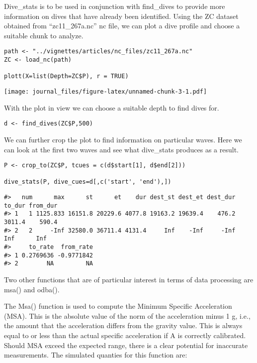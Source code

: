 Dive\_stats is to be used in conjunction with find\_dives to provide more information on dives that have already been identified. Using the ZC dataset obtained from ``zc11\_267a.nc'' nc file, we can plot a dive profile and choose a suitable chunk to analyze.

\begin{verbatim}
path <- "../vignettes/articles/nc_files/zc11_267a.nc"
ZC <- load_nc(path)

plott(X=list(Depth=ZC$P), r = TRUE)
\end{verbatim}

\texttt{[image: journal\_files/figure-latex/unnamed-chunk-3-1.pdf]}

With the plot in view we can choose a suitable depth to find dives for.

\begin{verbatim}
d <- find_dives(ZC$P,500) 
\end{verbatim}

We can further crop the plot to find information on particular waves. Here we can look at the first two waves and see what dive\_stats produces as a result.

\begin{verbatim}
P <- crop_to(ZC$P, tcues = c(d$start[1], d$end[2]))

dive_stats(P, dive_cues=d[,c('start', 'end'),])
\end{verbatim}

\begin{verbatim}
#>   num      max      st      et    dur dest_st dest_et dest_dur to_dur from_dur
#> 1   1 1125.833 16151.8 20229.6 4077.8 19163.2 19639.4    476.2 3011.4    590.4
#> 2   2     -Inf 32580.0 36711.4 4131.4     Inf    -Inf     -Inf    Inf      Inf
#>     to_rate  from_rate
#> 1 0.2769636 -0.9771842
#> 2        NA         NA
\end{verbatim}

Two other functions that are of particular interest in terms of data processing are msa() and odba().

The Msa() function is used to compute the Minimum Specific Acceleration (MSA). This is the absolute value of the norm of the acceleration minus 1 g, i.e., the amount that the acceleration differs from the gravity value. This is always equal to or less than the actual specific acceleration if A is correctly calibrated. Should MSA exceed the expected range, there is a clear potential for inaccurate measurements. The simulated quanties for this function are:

